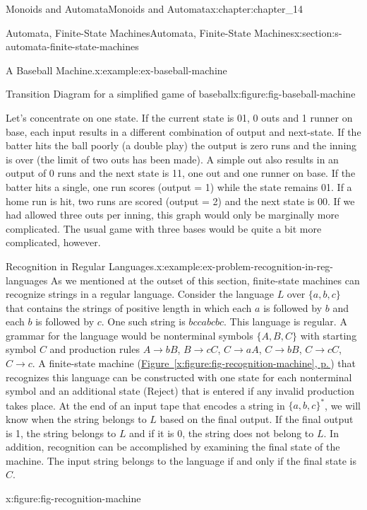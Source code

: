 \documentclass[twoside,10pt,]{book}
\newcommand{\xreffont}{\relax}
\numberwithin{equation}{section}
\begin{document}
\begin{chapterptx}{Monoids and Automata}{}{Monoids and Automata}{}{}{x:chapter:chapter_14}
\begin{sectionptx}{Automata, Finite-State Machines}{}{Automata, Finite-State Machines}{}{}{x:section:s-automata-finite-state-machines}
\begin{example}{A Baseball Machine.}{x:example:ex-baseball-machine}
\begin{figureptx}{Transition Diagram for a simplified game of baseball}{x:figure:fig-baseball-machine}{}
\begin{image}{0.15}{0.7}{0.15}
\end{image}%
\tcblower
\end{figureptx}%
Let's concentrate on one state. If the current state is 01, 0 outs and 1 runner on base, each input results in a different combination of output and next-state. If the batter hits the ball poorly (a double play) the output is zero runs and the inning is over (the limit of two outs has been made). A simple out also results in an output of 0 runs and the next state is 11, one out and one runner on base. If the batter hits a single, one run scores (output = 1) while the state remains 01. If a home run is hit, two runs are scored (output = 2) and the next state is 00. If we had allowed three outs per inning, this graph would only be marginally more complicated. The usual game with three bases would be quite a bit more complicated, however.%
\end{example}
\begin{example}{Recognition in Regular Languages.}{x:example:ex-problem-recognition-in-reg-languages}%
As we mentioned at the outset of this section, finite-state machines can recognize strings in a regular language. Consider the language \(L\) over \(\{a,b,c\}\) that contains the strings of positive length in which each \(a\) is followed by \(b\) and each \(b\) is followed by \(c\). One such string is \(bccabcbc\). This language is regular. A grammar for the language would be nonterminal symbols \(\{A,B,C\}\) with starting symbol \(C\) and production rules \(A\to bB\), \(B\to cC\), \(C\to aA\), \(C\to bB\), \(C \to cC\), \(C \to c\). A finite-state machine (\hyperref[x:figure:fig-recognition-machine]{Figure~{\xreffont\ref{x:figure:fig-recognition-machine}}, p.\,\pageref{x:figure:fig-recognition-machine}}) that recognizes this language can be constructed with one state for each nonterminal symbol and an additional state (Reject) that is entered if any invalid production takes place. At the end of an input tape that encodes a string in \(\{a,b,c\}^*\), we will know when the string belongs to \(L\) based on the final output. If the final output is 1, the string belongs to \(L\) and if it is 0, the string does not belong to \(L\). In addition, recognition can be accomplished by examining the final state of the machine. The input string belongs to the language if and only if the final state is \(C\).%
\begin{figureptx}{}{x:figure:fig-recognition-machine}{}%
\begin{image}{0.15}{0.7}{0.15}%

\end{image}
\end{figureptx}
\end{example}
\end{sectionptx}
\end{chapterptx}
\end{document}
